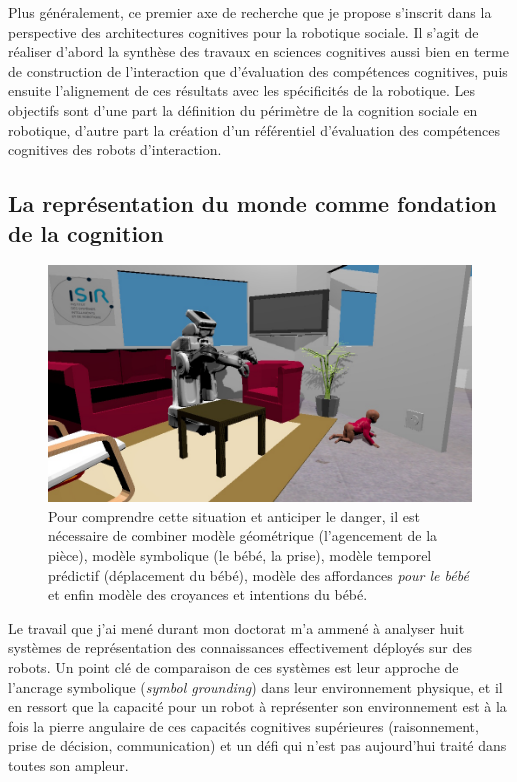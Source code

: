 \documentclass[a4paper]{article}
\begin{document}
Plus généralement, ce premier axe de recherche que je propose s'inscrit dans la
perspective des architectures cognitives pour la robotique sociale. Il s'agit de
réaliser d'abord la synthèse des travaux en sciences cognitives aussi bien en
terme de construction de l'interaction que d'évaluation des compétences
cognitives, puis ensuite l'alignement de ces résultats avec les spécificités de
la robotique. Les objectifs sont d'une part la définition du périmètre de la
cognition sociale en robotique, d'autre part la création d'un référentiel
d'évaluation des compétences cognitives des robots d'interaction.


\subsection{La représentation du monde comme fondation de la cognition}

\begin{figure}
\includegraphics[width=\textwidth]{figs/robots_home_baby_socket.jpg}
\caption{Pour comprendre cette situation et anticiper le danger, il est
    nécessaire de combiner modèle géométrique (l'agencement de la pièce), modèle
    symbolique (le bébé, la prise), modèle temporel prédictif (déplacement du
    bébé), modèle des affordances \emph{pour le bébé} et enfin modèle des
    croyances et intentions du bébé.}
\label{babyplug}
\end{figure}

Le travail que j'ai mené durant mon doctorat m'a ammené à analyser huit systèmes
de représentation des connaissances effectivement déployés sur des robots. Un
point clé de comparaison de ces systèmes est leur approche de l'ancrage
symbolique (\emph{symbol grounding}) dans leur environnement physique, et il en
ressort que la capacité pour un robot à représenter son environnement est à la
fois la pierre angulaire de ces capacités cognitives supérieures (raisonnement,
prise de décision, communication) et un défi qui n'est pas aujourd'hui traité
dans toutes son ampleur.
\end{document}
